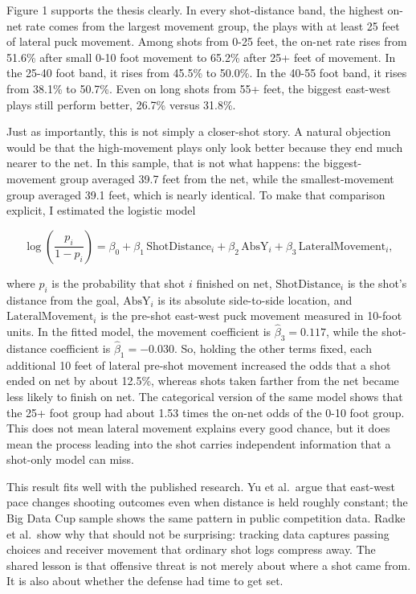 \documentclass[
  10pt,
]{extarticle}
\begin{document}
Figure 1 supports the thesis clearly. In every shot-distance band, the highest on-net rate comes from the largest movement group, the plays with at least 25 feet of lateral puck movement. Among shots from 0-25 feet, the on-net rate rises from 51.6\% after small 0-10 foot movement to 65.2\% after 25+ feet of movement. In the 25-40 foot band, it rises from 45.5\% to 50.0\%. In the 40-55 foot band, it rises from 38.1\% to 50.7\%. Even on long shots from 55+ feet, the biggest east-west plays still perform better, 26.7\% versus 31.8\%.

Just as importantly, this is not simply a closer-shot story. A natural objection would be that the high-movement plays only look better because they end much nearer to the net. In this sample, that is not what happens: the biggest-movement group averaged 39.7 feet from the net, while the smallest-movement group averaged 39.1 feet, which is nearly identical. To make that comparison explicit, I estimated the logistic model

\[
\log\left(\frac{p_i}{1 - p_i}\right)
= \beta_0 + \beta_1 \, \text{ShotDistance}_i + \beta_2 \, \text{AbsY}_i + \beta_3 \, \text{LateralMovement}_{i},
\]

where \(p_i\) is the probability that shot \(i\) finished on net, \(\text{ShotDistance}_i\) is the shot's distance from the goal, \(\text{AbsY}_i\) is its absolute side-to-side location, and \(\text{LateralMovement}_i\) is the pre-shot east-west puck movement measured in 10-foot units. In the fitted model, the movement coefficient is \(\hat{\beta}_3 = 0.117\), while the shot-distance coefficient is \(\hat{\beta}_1 = -0.030\). So, holding the other terms fixed, each additional 10 feet of lateral pre-shot movement increased the odds that a shot ended on net by about 12.5\%, whereas shots taken farther from the net became less likely to finish on net. The categorical version of the same model shows that the 25+ foot group had about 1.53 times the on-net odds of the 0-10 foot group. This does not mean lateral movement explains every good chance, but it does mean the process leading into the shot carries independent information that a shot-only model can miss.

This result fits well with the published research. Yu et al.~argue that east-west pace changes shooting outcomes even when distance is held roughly constant; the Big Data Cup sample shows the same pattern in public competition data. Radke et al.~show why that should not be surprising: tracking data captures passing choices and receiver movement that ordinary shot logs compress away. The shared lesson is that offensive threat is not merely about where a shot came from. It is also about whether the defense had time to get set.
\end{document}
